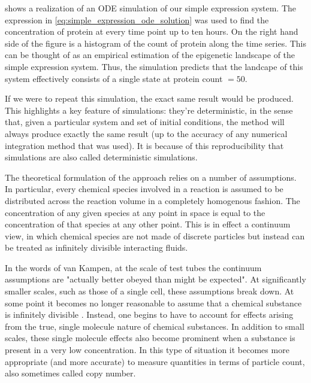  shows a realization of an ODE simulation of our simple expression system. The expression in \eqref{eq:simple_expression_ode_solution} was used to find the concentration of protein at every time point up to ten hours. On the right hand side of the figure is a histogram of the count of protein along the time series. This can be thought of as an empirical estimation of the epigenetic landscape of the simple expression system. Thus, the  simulation predicts that the landcape of this system effectively consists of a single state at protein count $= 50$.

If we were to repeat this simulation, the exact same result would be produced. This highlights a key feature of  simulations: they're deterministic, in the sense that, given a particular system and set of initial conditions, the method will always produce exactly the same result (up to the accuracy of any numerical integration method that was used). It is because of this reproducibility that  simulations are also called deterministic simulations.


The theoretical formulation of the  approach relies on a number of assumptions\supercite{Gillespie:2007bx}. In particular, every chemical species involved in a reaction is assumed to be distributed across the reaction volume in a completely homogenous fashion. The concentration of any given species at any point in space is equal to the concentration of that species at any other point. This is in effect a continuum view, in which chemical species are not made of discrete particles but instead can be treated as infinitely divisible interacting fluids.

In the words of van Kampen, at the scale of test tubes the continuum assumptions are "actually better obeyed than might be expected"\supercite{VanKampen:2011vs}. At significantly smaller scales, such as those of a single cell, these assumptions break down. At some point it becomes no longer reasonable to assume that a chemical substance is infinitely divisible . Instead, one begins to have to account for effects\supercite{Goutsias:2013gz} arising from the true, single molecule nature of chemical substances. In addition to small scales, these single molecule effects also become prominent when a substance is present in a very low concentration. In this type of situation it becomes more appropriate (and more accurate) to measure quantities in terms of particle count, also sometimes called copy number.

